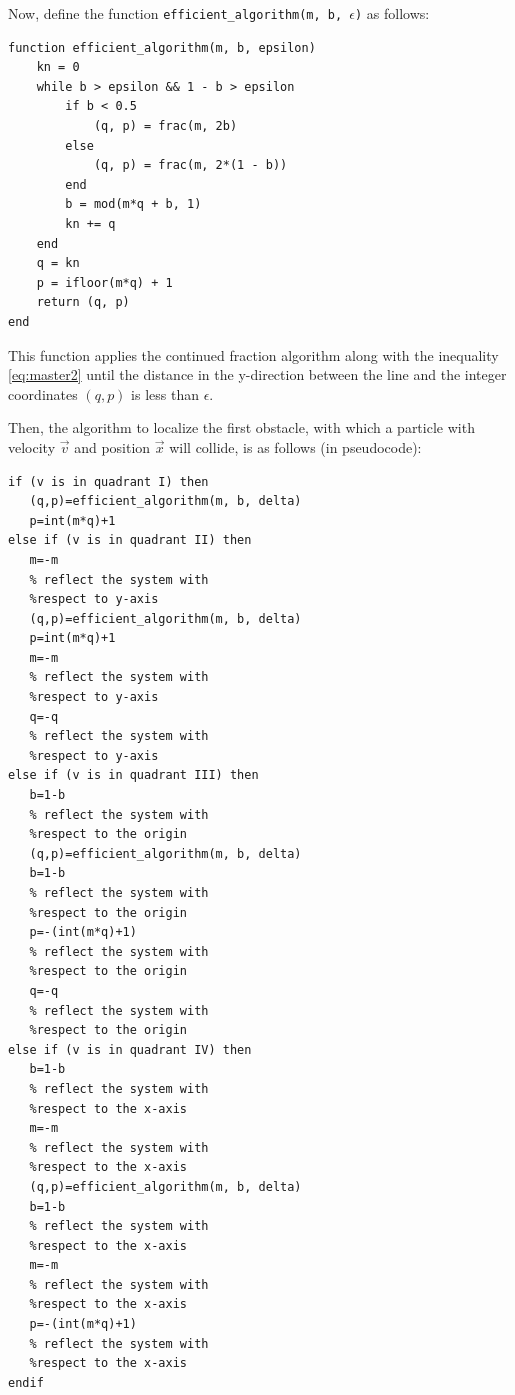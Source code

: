 \documentclass[prl,amsmath,amssymb, twocolumn, showpacs]{revtex4-1}
\begin{document}
Now, define the function \texttt{efficient\_algorithm(m, b, $\epsilon$)} as follows: 
\begin{verbatim}
function efficient_algorithm(m, b, epsilon) 
    kn = 0 
    while b > epsilon && 1 - b > epsilon 
        if b < 0.5 
            (q, p) = frac(m, 2b) 
        else 
            (q, p) = frac(m, 2*(1 - b)) 
        end 
        b = mod(m*q + b, 1) 
        kn += q 
    end 
    q = kn 
    p = ifloor(m*q) + 1 
    return (q, p) 
end
\end{verbatim}

This function applies the continued fraction algorithm along with the inequality \ref{eq:master2} until the distance in the y-direction between the line and the integer coordinates $(q, p)$ is less than $\epsilon$. 

Then, the algorithm to localize the first obstacle, with which a particle with velocity $\vec{v}$ and position $\vec{x}$ will collide, is as follows (in pseudocode): 

\begin{verbatim}
if (v is in quadrant I) then     
   (q,p)=efficient_algorithm(m, b, delta)
   p=int(m*q)+1
else if (v is in quadrant II) then
   m=-m                               
   % reflect the system with 
   %respect to y-axis 
   (q,p)=efficient_algorithm(m, b, delta)
   p=int(m*q)+1
   m=-m                                
   % reflect the system with 
   %respect to y-axis
   q=-q                                
   % reflect the system with 
   %respect to y-axis
else if (v is in quadrant III) then
   b=1-b                              
   % reflect the system with 
   %respect to the origin
   (q,p)=efficient_algorithm(m, b, delta)
   b=1-b                              
   % reflect the system with 
   %respect to the origin
   p=-(int(m*q)+1)                               
   % reflect the system with 
   %respect to the origin
   q=-q                               
   % reflect the system with 
   %respect to the origin
else if (v is in quadrant IV) then
   b=1-b                              
   % reflect the system with 
   %respect to the x-axis
   m=-m                               
   % reflect the system with 
   %respect to the x-axis
   (q,p)=efficient_algorithm(m, b, delta)             
   b=1-b                              
   % reflect the system with 
   %respect to the x-axis
   m=-m                               
   % reflect the system with 
   %respect to the x-axis
   p=-(int(m*q)+1)                               
   % reflect the system with 
   %respect to the x-axis
endif
\end{verbatim}
\end{document}
